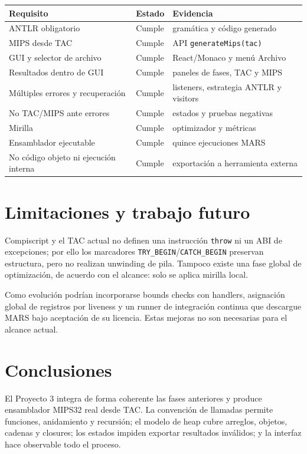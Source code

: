 \documentclass[11pt,letterpaper,oneside]{report}
\newcommand{\codigo}[1]{\texttt{#1}}
\begin{document}
\begin{longtable}{p{6cm}p{2.4cm}p{5cm}}
\toprule
Requisito & Estado & Evidencia\\\midrule
\endhead
ANTLR obligatorio & Cumple & gram\'atica y c\'odigo generado\\
MIPS desde TAC & Cumple & API \codigo{generateMips(tac)}\\
GUI y selector de archivo & Cumple & React/Monaco y men\'u Archivo\\
Resultados dentro de GUI & Cumple & paneles de fases, TAC y MIPS\\
M\'ultiples errores y recuperaci\'on & Cumple & listeners, estrategia ANTLR y visitors\\
No TAC/MIPS ante errores & Cumple & estados y pruebas negativas\\
Mirilla & Cumple & optimizador y m\'etricas\\
Ensamblador ejecutable & Cumple & quince ejecuciones MARS\\
No c\'odigo objeto ni ejecuci\'on interna & Cumple & exportaci\'on a herramienta externa\\
\bottomrule
\end{longtable}

\chapter{Limitaciones y trabajo futuro}

Compiscript y el TAC actual no definen una instrucci\'on \codigo{throw} ni un ABI de excepciones; por ello los marcadores \codigo{TRY\_BEGIN}/\codigo{CATCH\_BEGIN} preservan estructura, pero no realizan unwinding de pila. Tampoco existe una fase global de optimizaci\'on, de acuerdo con el alcance: solo se aplica mirilla local.

Como evoluci\'on podr\'ian incorporarse bounds checks con handlers, asignaci\'on global de registros por liveness y un runner de integraci\'on continua que descargue MARS bajo aceptaci\'on de su licencia. Estas mejoras no son necesarias para el alcance actual.

\chapter{Conclusiones}

El Proyecto 3 integra de forma coherente las fases anteriores y produce ensamblador MIPS32 real desde TAC. La convenci\'on de llamadas permite funciones, anidamiento y recursi\'on; el modelo de heap cubre arreglos, objetos, cadenas y closures; los estados impiden exportar resultados inv\'alidos; y la interfaz hace observable todo el proceso.
\end{document}
